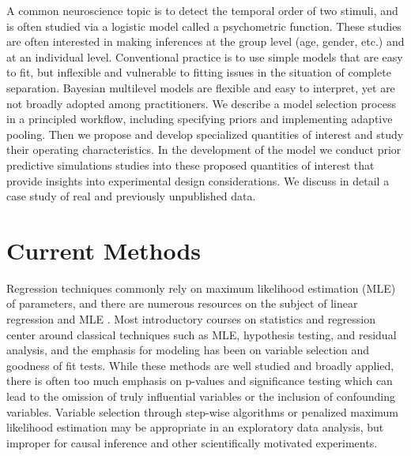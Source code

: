 \documentclass[11pt, oneside, openany]{scrbook}
\begin{document}
A common neuroscience topic is to detect the temporal order of two stimuli, and is often studied via a logistic model called a psychometric function. These studies are often interested in making inferences at the group level (age, gender, etc.) and at an individual level. Conventional practice is to use simple models that are easy to fit, but inflexible and vulnerable to fitting issues in the situation of complete separation. Bayesian multilevel models are flexible and easy to interpret, yet are not broadly adopted among practitioners. We describe a model selection process in a principled workflow, including specifying priors and implementing adaptive pooling. Then we propose and develop specialized quantities of interest and study their operating characteristics. In the development of the model we conduct prior predictive simulations studies into these proposed quantities of interest that provide insights into experimental design considerations. We discuss in detail a case study of real and previously unpublished data.

\hypertarget{current-methods}{%
\section{Current Methods}\label{current-methods}}

Regression techniques commonly rely on maximum likelihood estimation (MLE) of parameters, and there are numerous resources on the subject of linear regression and MLE \citep{johnson2002applied, larsen2005introduction, sheather2009modern, navidi2015statistics}. Most introductory courses on statistics and regression center around classical techniques such as MLE, hypothesis testing, and residual analysis, and the emphasis for modeling has been on variable selection and goodness of fit tests. While these methods are well studied and broadly applied, there is often too much emphasis on p-values and significance testing which can lead to the omission of truly influential variables or the inclusion of confounding variables. Variable selection through step-wise algorithms or penalized maximum likelihood estimation \citep{hoerl1970ridge, tibshirani1996regression} may be appropriate in an exploratory data analysis, but improper for causal inference and other scientifically motivated experiments.
\end{document}
